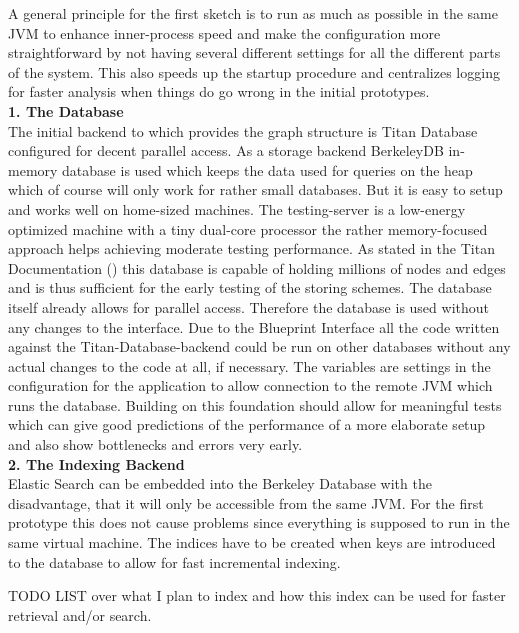 \documentclass[twoside, 11pt]{scrartcl}
\begin{document}
A general principle for the first sketch is to run as much as possible in the same JVM to enhance inner-process speed and make the configuration more straightforward by not having several different settings for all the different parts of the system. This also speeds up the startup procedure and centralizes logging for faster analysis when things do go wrong in the initial prototypes. \\

\textbf{1. The Database}\\
The initial backend to which provides the graph structure is Titan Database configured for decent parallel access. As a storage backend  BerkeleyDB in-memory database is used which keeps the data used for queries on the heap which of course will only work for rather small databases. But it is easy to setup and works well on home-sized machines. The testing-server is a low-energy optimized machine with a tiny dual-core processor the rather memory-focused approach helps achieving moderate testing performance. As stated in the Titan Documentation (\cite{link:titanWithBerkeley}) this database is capable of holding millions of nodes and edges and is thus sufficient for the early testing of the storing schemes. 
The database itself already allows for parallel access. Therefore the database is used without any changes to the interface. 
Due to the Blueprint Interface all the code written against the Titan-Database-backend could be run on other databases without any actual changes to the code at all, if necessary. The variables are settings in the configuration for the application to allow connection to the remote JVM which runs the database.
Building on this foundation should allow for meaningful tests which can give good predictions of the performance of a more elaborate setup and also show bottlenecks and errors very early.\\

\textbf{2. The Indexing Backend}\\
Elastic Search can be embedded into the Berkeley Database with the disadvantage, that it will only be accessible from the same JVM. For the first prototype this does not cause problems since everything is supposed to run in the same virtual machine.
The indices have to be created when keys are introduced to the database to allow for fast incremental indexing.

TODO LIST over what I plan to index and how this index can be used for faster retrieval and/or search.	\\
\end{document}
